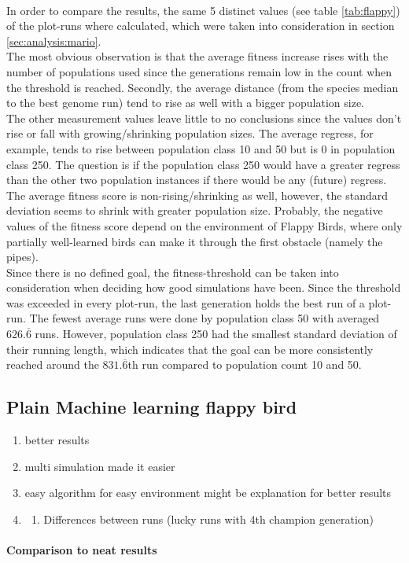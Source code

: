 			 \\
			In order to compare the results, the same 5 distinct values (see table \ref{tab:flappy}) of the plot-runs where calculated, which were taken into consideration in section \ref{sec:analysis:mario}.\\
			The most obvious observation is that the average fitness increase rises with the number of populations used since the generations remain low in the count when the threshold is reached. Secondly, the average distance (from the species median to the best genome run) tend to rise as well with a bigger population size.\\ 
			The other measurement values leave little to no conclusions since the values don't rise or fall with growing/shrinking population sizes. The average regress, for example, tends to rise between population class 10 and 50 but is 0 in population class 250. The question is if the population class 250 would have a greater regress than the other two population instances if there would be any (future) regress. The average fitness score is non-rising/shrinking as well, however, the standard deviation seems to shrink with greater population size. Probably, the negative values of the fitness score depend on the environment of Flappy Birds, where only partially well-learned birds can make it through the first obstacle (namely the pipes).\\
			Since there is no defined goal, the fitness-threshold can be taken into consideration when deciding how good simulations have been. Since the threshold was exceeded in every plot-run, the last generation holds the best run of a plot-run. The fewest average runs were done by population class 50 with averaged $626.\overline{6}$ runs. However, population class 250 had the smallest standard deviation of their running length, which indicates that the goal can be more consistently reached around the $831.\overline{6}$th run compared to population count 10 and 50.
			
		\subsection{Plain Machine learning flappy bird}
			\begin{enumerate}
				\item better results
				\item multi simulation made it easier
				\item easy algorithm for easy environment might be explanation for better results
				\item \begin{enumerate}
					\item Differences between runs (lucky runs with 4th champion generation)
				\end{enumerate}
			\end{enumerate}
			\paragraph{Comparison to \gls{neat} results}